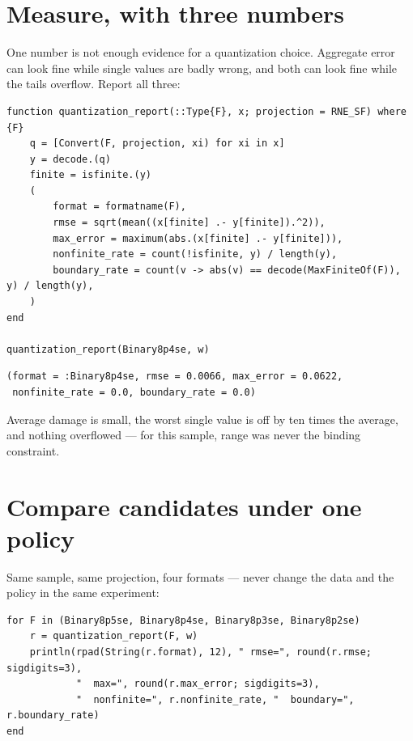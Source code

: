 \section{Measure, with three numbers}



\label{3943201719433937344}{}


One number is not enough evidence for a quantization choice. Aggregate error can look fine while single values are badly wrong, and both can look fine while the tails overflow. Report all three:




\begin{verbatim}
function quantization_report(::Type{F}, x; projection = RNE_SF) where {F}
    q = [Convert(F, projection, xi) for xi in x]
    y = decode.(q)
    finite = isfinite.(y)
    (
        format = formatname(F),
        rmse = sqrt(mean((x[finite] .- y[finite]).^2)),
        max_error = maximum(abs.(x[finite] .- y[finite])),
        nonfinite_rate = count(!isfinite, y) / length(y),
        boundary_rate = count(v -> abs(v) == decode(MaxFiniteOf(F)), y) / length(y),
    )
end

quantization_report(Binary8p4se, w)
\end{verbatim}




\begin{verbatim}
(format = :Binary8p4se, rmse = 0.0066, max_error = 0.0622,
 nonfinite_rate = 0.0, boundary_rate = 0.0)
\end{verbatim}



Average damage is small, the worst single value is off by ten times the average, and nothing overflowed — for this sample, range was never the binding constraint.



\section{Compare candidates under one policy}



\label{4920482121782597622}{}


Same sample, same projection, four formats — never change the data and the policy in the same experiment:




\begin{verbatim}
for F in (Binary8p5se, Binary8p4se, Binary8p3se, Binary8p2se)
    r = quantization_report(F, w)
    println(rpad(String(r.format), 12), " rmse=", round(r.rmse; sigdigits=3),
            "  max=", round(r.max_error; sigdigits=3),
            "  nonfinite=", r.nonfinite_rate, "  boundary=", r.boundary_rate)
end
\end{verbatim}




